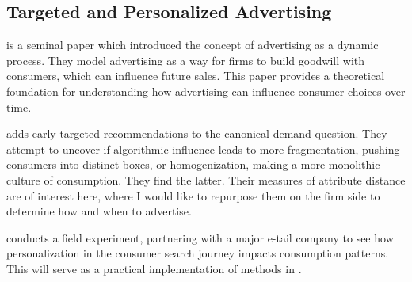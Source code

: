 \documentclass[12pt]{article}
\begin{document}
\subsection{Targeted and Personalized Advertising}

\cite{nerlove1962advertising} is a seminal paper which introduced the concept of advertising as a dynamic process. They model advertising as a way for firms to build goodwill with consumers, which can influence future sales. This paper provides a theoretical foundation for understanding how advertising can influence consumer choices over time.

\cite{hosanagar2014village} adds early targeted recommendations to the canonical demand question. They attempt to uncover if algorithmic influence leads to more fragmentation, pushing consumers into distinct boxes, or homogenization, making a more monolithic culture of consumption. They find the latter. Their measures of attribute distance are of interest here, where I would like to repurpose them on the firm side to determine how and when to advertise.

\cite{song2025optimizing} conducts a field experiment, partnering with a major e-tail company to see how personalization in the consumer search journey impacts consumption patterns. This will serve as a practical implementation of methods in \cite{wei2024nne}.

\newpage
\end{document}
